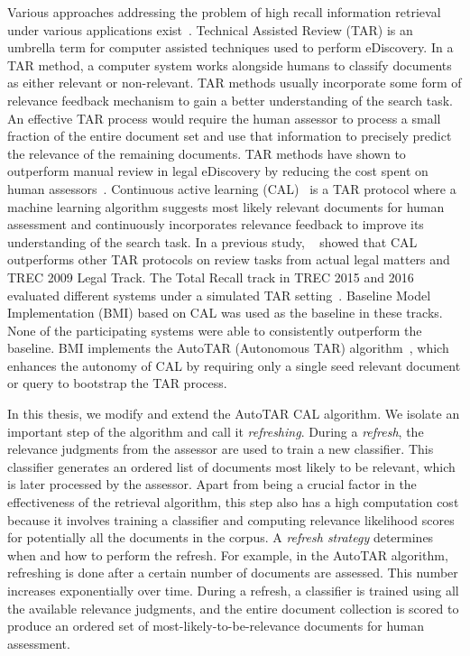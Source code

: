 Various approaches addressing the problem of high recall information retrieval
under various applications
exist~\cite{li2014req,hogan2010automation,cormack2014evaluation}. Technical
Assisted Review (TAR) is an umbrella term for computer assisted techniques used
to perform eDiscovery.  In a TAR method, a computer system works alongside
humans to classify documents as either relevant or non-relevant. TAR methods
usually incorporate some form of relevance feedback mechanism to gain a
better understanding of the search task. An effective TAR process would require
the human assessor to process a small fraction of the entire document set and
use that information to precisely predict the relevance of the remaining
documents. TAR methods have shown to outperform manual review in legal
eDiscovery by reducing the cost spent on human
assessors~\cite{grossman2010technology,roitblat2010document}.   Continuous
active learning (CAL)~\cite{cormack2014evaluation,cormack2015autonomy} is a TAR
protocol where a machine learning algorithm suggests most likely relevant
documents for human assessment and continuously incorporates relevance feedback
to improve its understanding of the search task.  In a previous study,
~\citet{cormack2014evaluation} showed that CAL outperforms other TAR
protocols on review tasks from actual legal matters and TREC 2009 Legal Track.
The Total Recall track in TREC 2015 and 2016 evaluated different systems under a
simulated TAR setting~\cite{grossman2016trec,roegiest2015trec}.  Baseline Model
Implementation (BMI) based on CAL was used as the baseline in these tracks. None
of the participating systems were able to consistently outperform the baseline.
BMI implements the AutoTAR (Autonomous TAR)
algorithm~\cite{cormack2015autonomy}, which enhances the autonomy of CAL by
requiring only a single seed relevant document or query to bootstrap the TAR
process.

In this thesis, we modify and extend the AutoTAR CAL algorithm. We isolate an
important step of the algorithm and call it \textit{refreshing}.  During a
\textit{refresh}, the relevance judgments from the assessor are used to train a
new classifier. This classifier generates an ordered list of documents most
likely to be relevant, which is later processed by the assessor. Apart from
being a crucial factor in the effectiveness of the retrieval algorithm, this
step also has a high computation cost because it involves training a classifier
and computing relevance likelihood scores for potentially all the documents in
the corpus. A \textit{refresh strategy} determines when and how to perform the
refresh. For example, in the AutoTAR algorithm, refreshing is done after a
certain number of documents are assessed. This number increases exponentially
over time. During a refresh, a classifier is trained using all the available
relevance judgments, and the entire document collection is scored to produce an
ordered set of most-likely-to-be-relevance documents for human assessment.


